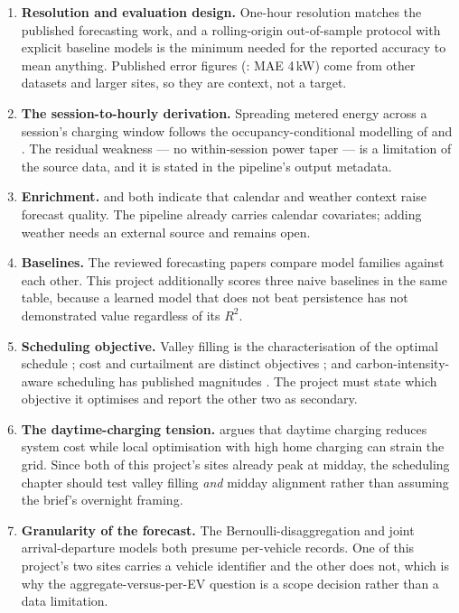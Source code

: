 \documentclass[11pt,a4paper]{article}
\begin{document}
\begin{enumerate}
  \item \textbf{Resolution and evaluation design.} One-hour resolution matches the published
        forecasting work, and a rolling-origin out-of-sample protocol with explicit baseline models
        is the minimum needed for the reported accuracy to mean anything. Published error figures
        (\cite{Vishnu2023ShortTermEVLoadTSMLDL}: MAE 4\,kW) come from other datasets and larger sites,
        so they are context, not a target.
  \item \textbf{The session-to-hourly derivation.} Spreading metered energy across a session's
        charging window follows the occupancy-conditional modelling of
        \cite{Yi2018ResidentialLoadProfileGeneration} and \cite{Uimonen2020OfficeBuildingOccupancy}.
        The residual weakness --- no within-session power taper --- is a limitation of the source
        data, and it is stated in the pipeline's output metadata.
  \item \textbf{Enrichment.} \cite{vonHoffen2016ChargingTransactionAnalytics} and
        \cite{Zhang2022MCCNNTCN} both indicate that calendar and weather context raise forecast
        quality. The pipeline already carries calendar covariates; adding weather needs an external
        source and remains open.
  \item \textbf{Baselines.} The reviewed forecasting papers compare model families against each
        other. This project additionally scores three naive baselines in the same table, because a
        learned model that does not beat persistence has not demonstrated value regardless of its
        $R^2$.
  \item \textbf{Scheduling objective.} Valley filling is the characterisation of the optimal
        schedule \cite{Chen2012ValleyFilling}; cost and curtailment are distinct objectives
        \cite{Szinai2020ReducedGridOperatingCosts}; and carbon-intensity-aware scheduling has
        published magnitudes \cite{Dixon2020MinimiseEmissionsWindCurtailment}. The project must
        state which objective it optimises and report the other two as secondary.
  \item \textbf{The daytime-charging tension.} \cite{Powell2022ChargingInfrastructureGridImpacts}
        argues that daytime charging reduces system cost while local optimisation with high home
        charging can strain the grid. Since both of this project's sites already peak at midday,
        the scheduling chapter should test valley filling \emph{and} midday alignment rather than
        assuming the brief's overnight framing.
  \item \textbf{Granularity of the forecast.} The Bernoulli-disaggregation and joint
        arrival-departure models \cite{Munkhammar2014BernoulliPEVCharging,Lahariya2020SyntheticDataGenerator}
        both presume per-vehicle records. One of this project's two sites carries a vehicle
        identifier and the other does not, which is why the aggregate-versus-per-EV question is a
        scope decision rather than a data limitation.
\end{enumerate}
\end{document}
